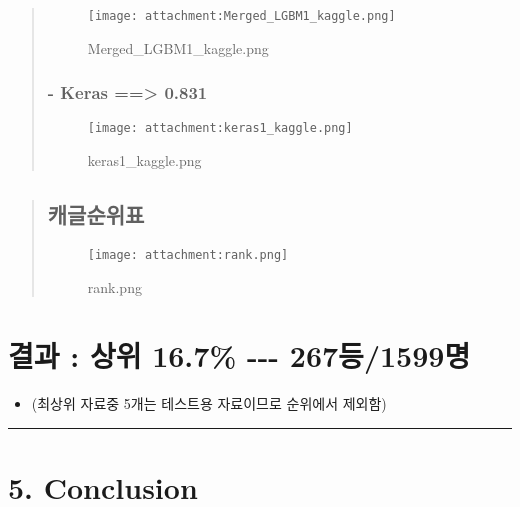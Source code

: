 \documentclass[11pt]{article}
\makeatletter
\def\maxwidth{\ifdim\Gin@nat@width>\linewidth\linewidth
    \else\Gin@nat@width\fi}
\let\Oldincludegraphics\includegraphics
\renewcommand{\includegraphics}[1]{\Oldincludegraphics[width=.8\maxwidth]{#1}}
\providecommand{\tightlist}{%
      \setlength{\itemsep}{0pt}\setlength{\parskip}{0pt}}
\makeatother
\begin{document}
\begin{quote}
\begin{figure}
\centering
\texttt{[image: attachment:Merged\_LGBM1\_kaggle.png]}
\caption{Merged\_LGBM1\_kaggle.png}
\end{figure}

\subsubsection{- Keras ==\textgreater{} 0.831}\label{keras-0.831}

\begin{figure}
\centering
\texttt{[image: attachment:keras1\_kaggle.png]}
\caption{keras1\_kaggle.png}
\end{figure}
\end{quote}

    \begin{quote}
\subsection{캐글순위표}\label{uxce90uxae00uxc21cuxc704uxd45c}

\begin{figure}
\centering
\texttt{[image: attachment:rank.png]}
\caption{rank.png}
\end{figure}
\end{quote}

    \section{결과 : 상위 16.7\% -\/-\/-
267등/1599명}\label{uxacb0uxacfc-uxc0c1uxc704-16.7-----267uxb4f11599uxba85}

\begin{itemize}
\tightlist
\item
  (최상위 자료중 5개는 테스트용 자료이므로 순위에서 제외함)
\end{itemize}

    \begin{center}\rule{0.5\linewidth}{\linethickness}\end{center}

\section{5. Conclusion}\label{conclusion}
\end{document}

